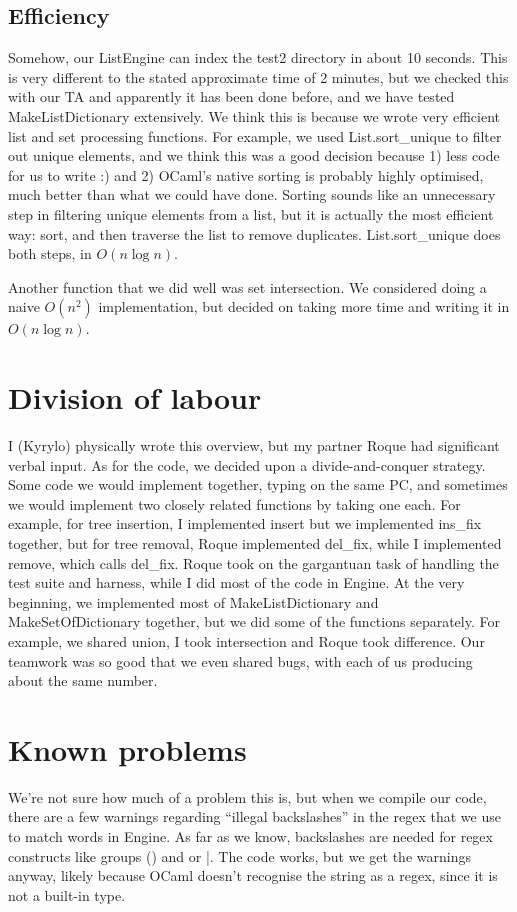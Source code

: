 \subsection{Efficiency}
Somehow, our ListEngine can index the test2 directory in about 10 seconds. This is very different to the stated approximate time of 2 minutes, but we checked this with our TA and apparently it has been done before, and we have tested MakeListDictionary extensively. We think this is because we wrote very efficient list and set processing functions. For example, we used List.sort\_unique to filter out unique elements, and we think this was a good decision because 1) less code for us to write :) and 2) OCaml's native sorting is probably highly optimised, much better than what we could have done. Sorting sounds like an unnecessary step in filtering unique elements from a list, but it is actually the most efficient way: sort, and then traverse the list to remove duplicates. List.sort\_unique does both steps, in $O(n \log n)$.

Another function that we did well was set intersection. We considered doing a naive $O(n^2)$ implementation, but decided on taking more time and writing it in $O(n \log n)$.

\section{Division of labour}
I (Kyrylo) physically wrote this overview, but my partner Roque had significant verbal input. As for the code, we decided upon a divide-and-conquer strategy. Some code we would implement together, typing on the same PC, and sometimes we would implement two closely related functions by taking one each. For example, for tree insertion, I implemented insert but we implemented ins\_fix together, but for tree removal, Roque implemented del\_fix, while I implemented remove, which calls del\_fix. Roque took on the gargantuan task of handling the test suite and harness, while I did most of the code in Engine. At the very beginning, we implemented most of MakeListDictionary and MakeSetOfDictionary together, but we did some of the functions separately. For example, we shared union, I took intersection and Roque took difference. Our teamwork was so good that we even shared bugs, with each of us producing about the same number.

\section{Known problems}
We're not sure how much of a problem this is, but when we compile our code, there are a few warnings regarding ``illegal backslashes'' in the regex that we use to match words in Engine. As far as we know, backslashes are needed for regex constructs like groups () and or |. The code works, but we get the warnings anyway, likely because OCaml doesn't recognise the string as a regex, since it is not a built-in type.


